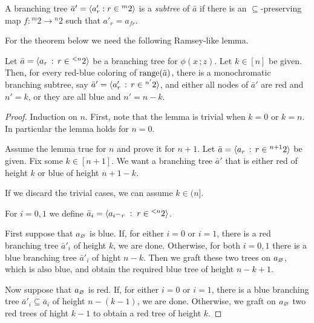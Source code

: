 \documentclass[scombinatorics.tex]{subfiles}
\begin{document}
A branching tree $\bar a'=\langle a'_r:r\in{}^m2\rangle$ is a \emph{subtree\/} of $\bar a$ if there is an $\subseteq$-preserving map $f:{}^m2\to{}^n2$ such that $a'_r=a_{fr}$.

For the theorem below we need the following Ramsey-like lemma.



\begin{lemma}\label{lem_Reamsey_tree}
  Let $\bar a=\langle a_r\, :\, r\in{}^{<n}2\rangle$ be a branching tree for $\phi(x\,;z)$.
  Let $k\in[n]$ be given.
  Then, for every red-blue coloring of $\mathop{\rm range}(\bar a)$,  there is a monochromatic branching subtree, say $\bar a'=\langle a'_r\, :\, r\in{}^{n'}2\rangle$, and either all nodes of $\bar a'$ are red and $n'=k$, or they are all blue and $n'=n-k$.
\end{lemma}

\begin{proof}
  Induction on $n$.
  First, note that the lemma is trivial when $k=0$ or $k=n$.
  In particular the lemma holds for $n=0$.

  Assume the lemma true for $n$ and prove it for $n+1$.
  Let  $\bar a=\langle a_r\, :\, r\in{}^{n+1}2\rangle$ be given.
  Fix some $k\in[n+1]$. 
  We want a branching tree $\bar a'$ that is either red of height $k$ or blue of height $n+1-k$.
  
  If we discard the trivial cases, we can assume $k\in(n]$.

  For $i=0,1$ we define $\bar a_i=\langle a_{i^\frown r}\;:\;r\in {}^{<n}2\rangle$.

  First suppose that $a_\varnothing$ is blue.
  If, for either $i=0$ or $i=1$, there is a red branching tree $\bar a'_i$ of height $k$, we are done.
  Otherwise, for both $i=0,1$ there is a blue branching tree $\bar a'_i$ of hight $n-k$.
  Then we graft these two trees on $a_\varnothing$, which is also blue, and obtain the required blue tree of height $n-k+1$.
  
  Now suppose that $a_\varnothing$ is red.
  If, for either $i=0$ or $i=1$, there is a blue branching tree $\bar a'_i\subseteq \bar a_i$ of height $n-(k-1)$, we are done.
  Otherwise, we graft on $a_\varnothing$ two red trees of hight $k-1$ to obtain a red tree of height $k$.  
\end{proof}
\end{document}
